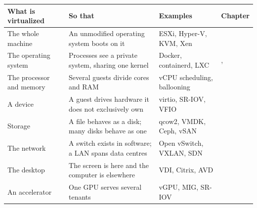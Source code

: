 \begin{longtable}{@{}L{3.2cm}L{4.9cm}L{3.0cm}L{3.6cm}@{}}
\toprule
{}
\textbf{What is virtualized} & \textbf{So that} & \textbf{Examples} &
\textbf{Chapter} \\
\midrule
\endhead
The whole machine & An unmodified operating system boots on it &
ESXi, Hyper-V, KVM, Xen &  \\
The operating system & Processes see a private system, sharing one kernel &
Docker, containerd, LXC & ,  \\
The processor and memory & Several guests divide cores and RAM & vCPU
scheduling, ballooning &  \\
A device & A guest drives hardware it does not exclusively own & virtio,
SR-IOV, VFIO &  \\
Storage & A file behaves as a disk; many disks behave as one & qcow2, VMDK,
Ceph, vSAN &  \\
The network & A switch exists in software; a LAN spans data centres & Open
vSwitch, VXLAN, SDN &  \\
The desktop & The screen is here and the computer is elsewhere & VDI, Citrix,
AVD &  \\
An accelerator & One GPU serves several tenants & vGPU, MIG, SR-IOV &
 \\
\bottomrule
\end{longtable}

